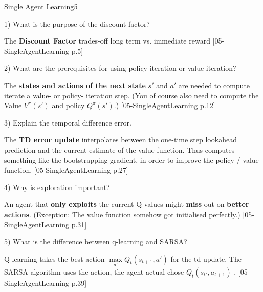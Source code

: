 \newif\ifvimbug
\vimbugfalse

\ifvimbug

	\fi
{}

\begin{questions}
\begin{question}{Single Agent Learning}{5}
		
		1) What is the purpose of the discount factor?	
\begin{answer}
	
	The \textbf{Discount Factor} trades-off long term vs. immediate reward
	[05-SingleAgentLearning p.5]
\end{answer}

	2) What are the prerequisites for using policy iteration or value iteration? 
\begin{answer}
	
	The \textbf{states and actions of the next state} $s'$  and $a'$  are needed to compute iterate a value- or policy- iteration step.
	(You of course also need to compute the Value $V^\pi(s')$ and policy $Q^\pi(s')$.)
	[05-SingleAgentLearning p.12]
\end{answer}

	3) Explain the temporal difference error. 
\begin{answer}
	
		The \textbf{TD error update } interpolates between the one-time step lookahead prediction and the current estimate of the value function. Thus computes something like the bootstrapping gradient, in order to improve the policy / value function.
		[05-SingleAgentLearning p.27]
\end{answer}

	4) Why is exploration important? 
\begin{answer}
	
		An agent that \textbf{only exploits} the current Q-values might \textbf{miss} out on \textbf{better actions}. (Exception: The value function somehow got initialised perfectly.)
		[05-SingleAgentLearning p.31]
\end{answer}

	5) What is the difference between q-learning and SARSA? 
\begin{answer}
	
		Q-learning takes the best action $\max\limits_{a'} Q_t(s_{t+1},a')$ for the td-update. The SARSA algorithm uses the action, the agent actual chose  $Q_t(s_{t'},a_{t+1})$ .
		[05-SingleAgentLearning p.39]
\end{answer}
	


\end{question}
\end{questions}
